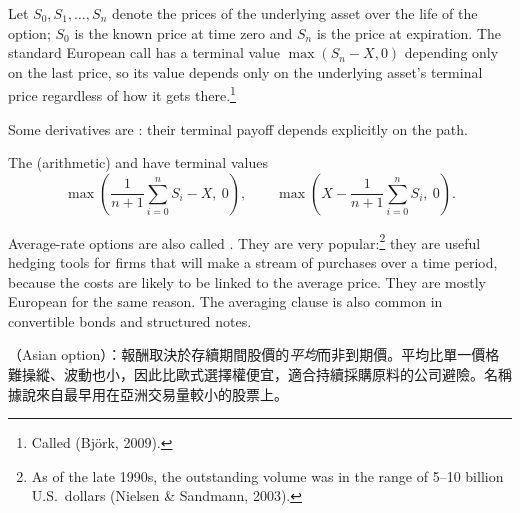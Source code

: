 Let $S_{0},S_{1},\ldots,S_{n}$ denote the prices of the underlying asset over the life of the option; $S_{0}$ is the known price at time zero and $S_{n}$ is the price at expiration.
The standard European call has a terminal value $\max(S_{n}-X,0)$ depending only on the last price, so its value depends only on the underlying asset's terminal price regardless of how it gets there.\footnote{Called  (Björk, 2009).}

\suppstart
{}
\suppend


Some derivatives are : their terminal payoff depends explicitly on the path.

\suppstart
{}
\suppend

\begin{definition}
	The (arithmetic)  and  have terminal values
	\[
		\max\left(\frac{1}{n+1}\sum_{i=0}^{n}S_{i}-X,\ 0\right) ,
		\qquad
		\max\left(X-\frac{1}{n+1}\sum_{i=0}^{n}S_{i},\ 0\right) .
	\]
\end{definition}

\suppstart
{}
\suppend

Average-rate options are also called .
They are very popular:\footnote{As of the late 1990s, the outstanding volume was in the range of 5--10 billion U.S.\ dollars (Nielsen \& Sandmann, 2003).} they are useful hedging tools for firms that will make a stream of purchases over a time period, because the costs are likely to be linked to the average price.
They are mostly European for the same reason.
The averaging clause is also common in convertible bonds and structured notes.

\suppstart
{}

\begin{remark}
	（Asian option）：報酬取決於存續期間股價的\emph{平均}而非到期價。平均比單一價格難操縱、波動也小，因此比歐式選擇權便宜，適合持續採購原料的公司避險。名稱據說來自最早用在亞洲交易量較小的股票上。
\end{remark}
\suppend


